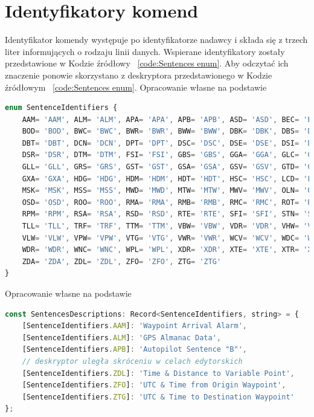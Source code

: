 \documentclass[skorowidz,skroty]{dyplomWEZUT}
\begin{document}
\section{Identyfikatory komend}\label{sec:sentence ids}
Identyfikator komendy występuje po identyfikatorze nadawcy i składa się z trzech liter informujących o rodzaju linii danych. Wspierane identyfikatory zostały przedstawione w Kodzie źródłowy ~\ref{code:Sentences enum}. Aby odczytać ich znaczenie ponowie skorzystano z deskryptora przedstawionego w Kodzie źródłowym ~\ref{code:Sentences enum}.
{Opracowanie własne na podstawie \cite{gpsinformation, Raymond2019}}{\label{code:Sentences enum}}
\begin{lstlisting}[language=JavaScript]
enum SentenceIdentifiers {
    AAM= 'AAM', ALM= 'ALM', APA= 'APA', APB= 'APB', ASD= 'ASD', BEC= 'BEC',
    BOD= 'BOD', BWC= 'BWC', BWR= 'BWR', BWW= 'BWW', DBK= 'DBK', DBS= 'DBS',
    DBT= 'DBT', DCN= 'DCN', DPT= 'DPT', DSC= 'DSC', DSE= 'DSE', DSI= 'DSI',
    DSR= 'DSR', DTM= 'DTM', FSI= 'FSI', GBS= 'GBS', GGA= 'GGA', GLC= 'GLC',
    GLL= 'GLL', GRS= 'GRS', GST= 'GST', GSA= 'GSA', GSV= 'GSV', GTD= 'GTD',
    GXA= 'GXA', HDG= 'HDG', HDM= 'HDM', HDT= 'HDT', HSC= 'HSC', LCD= 'LCD',
    MSK= 'MSK', MSS= 'MSS', MWD= 'MWD', MTW= 'MTW', MWV= 'MWV', OLN= 'OLN',
    OSD= 'OSD', ROO= 'ROO', RMA= 'RMA', RMB= 'RMB', RMC= 'RMC', ROT= 'ROT',
    RPM= 'RPM', RSA= 'RSA', RSD= 'RSD', RTE= 'RTE', SFI= 'SFI', STN= 'STN',
    TLL= 'TLL', TRF= 'TRF', TTM= 'TTM', VBW= 'VBW', VDR= 'VDR', VHW= 'VHW',
    VLW= 'VLW', VPW= 'VPW', VTG= 'VTG', VWR= 'VWR', WCV= 'WCV', WDC= 'WDC',
    WDR= 'WDR', WNC= 'WNC', WPL= 'WPL', XDR= 'XDR', XTE= 'XTE', XTR= 'XTR',
    ZDA= 'ZDA', ZDL= 'ZDL', ZFO= 'ZFO', ZTG= 'ZTG'
}
\end{lstlisting}

{Opracowanie własne na podstawie \cite{gpsinformation, Raymond2019}}{\label{code: sentences descriptors}}
\begin{lstlisting}[language=JavaScript]
const SentencesDescriptions: Record<SentenceIdentifiers, string> = {
    [SentenceIdentifiers.AAM]: 'Waypoint Arrival Alarm',
    [SentenceIdentifiers.ALM]: 'GPS Almanac Data',
    [SentenceIdentifiers.APB]: 'Autopilot Sentence "B"',
    // deskryptor uległa skróceniu w celach edytorskich
    [SentenceIdentifiers.ZDL]: 'Time & Distance to Variable Point',
    [SentenceIdentifiers.ZFO]: 'UTC & Time from Origin Waypoint',
    [SentenceIdentifiers.ZTG]: 'UTC & Time to Destination Waypoint'
};
\end{lstlisting}
\end{document}
